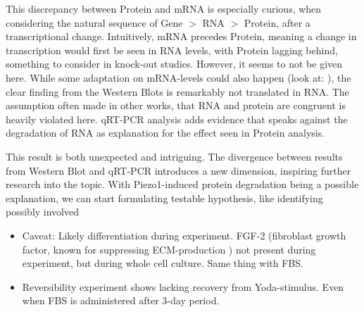 This discrepancy between Protein and mRNA is especially curious, when considering the natural sequence of Gene $>$ RNA $>$ Protein, after a transcriptional change. Intuitively, mRNA precedes Protein, meaning a change in transcription would first be seen in RNA levels, with Protein lagging behind, 
something to consider in knock-out studies. However, it seems to not be given here. While some adaptation on mRNA-levels could also happen (look at:  \colone), the clear finding from the Western Blots is remarkably not translated in RNA. The assumption often made in other works, that RNA and protein are congruent is heavily violated here. qRT-PCR analysis adds evidence that speaks against the degradation of RNA as explanation for the effect seen in Protein analysis. 

This result is both unexpected and intriguing. The divergence between results from Western Blot and qRT-PCR introduces a new dimension, inspiring further research into the topic. With Piezo1-induced protein degradation being a possible explanation, we can start formulating testable hypothesis, like identifying possibly involved 

\begin{itemize}
     \item  Caveat: Likely differentiation during experiment. FGF-2 (fibroblast growth factor, known for suppressing ECM-production ) not present during experiment, but during whole cell culture. Same thing with FBS. 
    
    \item Reversibility experiment shows lacking recovery from Yoda-stimulus. Even when FBS is administered after 3-day period.
\end{itemize}




